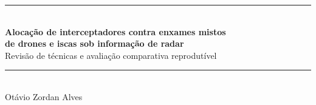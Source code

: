 \documentclass[11pt,a4paper]{article}
\begin{document}
\thispagestyle{empty}
\begin{center}
{\color{azul}\rule{\textwidth}{1.2pt}}\\[10pt]
{\sffamily\bfseries\LARGE\color{azul}Alocação de interceptadores contra enxames mistos\\[2pt]
de drones e iscas sob informação de radar}\\[8pt]
{\sffamily\large Revisão de técnicas e avaliação comparativa reprodutível}\\[8pt]
{\color{azul}\rule{\textwidth}{1.2pt}}\\[14pt]
{\large Otávio Zordan Alves}\\[18pt]
\end{center}

\tableofcontents
\newpage












\end{document}

